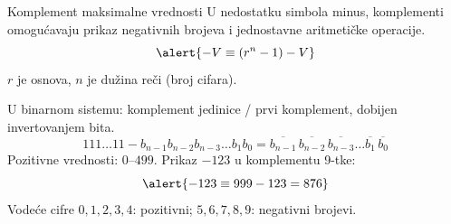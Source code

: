 \begin{frame}[label=04-s033]{Komplement maksimalne vrednosti}
U nedostatku simbola minus, komplementi omogućavaju prikaz negativnih brojeva i jednostavne aritmetičke operacije.
\[\alert{-V\equiv(r^n-1)-V}\]
$r$ je osnova, $n$ je dužina reči (broj cifara).\par
U binarnom sistemu: \alert{komplement jedinice / prvi komplement}, dobijen invertovanjem bita.
{\fontsize{10}{12}\selectfont
\[111\ldots11-b_{n-1}b_{n-2}b_{n-3}\ldots b_1b_0=\overline{b_{n-1}}\,\overline{b_{n-2}}\,\overline{b_{n-3}}\ldots\overline{b_1}\,\overline{b_0}\]}
Pozitivne vrednosti: $0$–$499$. Prikaz $-123$ u komplementu 9-tke:
\[\alert{-123\equiv999-123=876}\]
Vodeće cifre $0,1,2,3,4$: pozitivni; $5,6,7,8,9$: negativni brojevi.
\end{frame}
